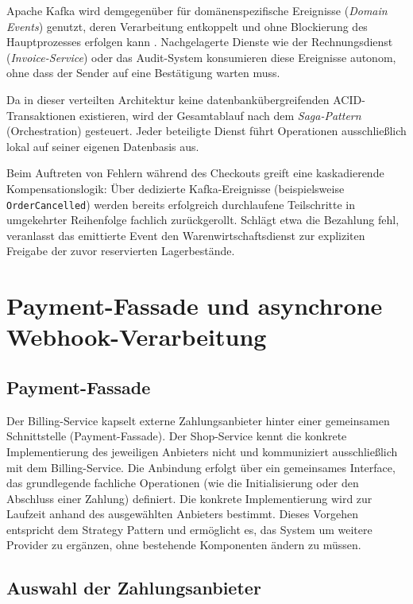\documentclass[
  11pt,
  a4paper,
  oneside,
  headings=normal,
  parskip=half,
  DIV=12
]{scrreprt}
\begin{document}
Apache Kafka wird demgegenüber für domänenspezifische Ereignisse (\textit{Domain Events}) genutzt, deren Verarbeitung entkoppelt und ohne Blockierung des Hauptprozesses erfolgen kann \cite{apacheKafka}. Nachgelagerte Dienste wie der Rechnungsdienst (\textit{Invoice-Service}) oder das Audit-System konsumieren diese Ereignisse autonom, ohne dass der Sender auf eine Bestätigung warten muss.

Da in dieser verteilten Architektur keine datenbankübergreifenden ACID-Transaktionen existieren, wird der Gesamtablauf nach dem \textit{Saga-Pattern} (Orchestration) gesteuert. Jeder beteiligte Dienst führt Operationen ausschließlich lokal auf seiner eigenen Datenbasis aus.

Beim Auftreten von Fehlern während des Checkouts greift eine kaskadierende Kompensationslogik: Über dedizierte Kafka-Ereignisse (beispielsweise \texttt{OrderCancelled}) werden bereits erfolgreich durchlaufene Teilschritte in umgekehrter Reihenfolge fachlich zurückgerollt. Schlägt etwa die Bezahlung fehl, veranlasst das emittierte Event den Warenwirtschaftsdienst zur expliziten Freigabe der zuvor reservierten Lagerbestände.

\section{Payment-Fassade und asynchrone Webhook-Verarbeitung}

\subsection{Payment-Fassade}

Der Billing-Service kapselt externe Zahlungsanbieter hinter einer gemeinsamen Schnittstelle (Payment-Fassade). Der Shop-Service kennt die konkrete Implementierung des jeweiligen Anbieters nicht und kommuniziert ausschließlich mit dem Billing-Service. Die Anbindung erfolgt über ein gemeinsames Interface, das grundlegende fachliche Operationen (wie die Initialisierung oder den Abschluss einer Zahlung) definiert. Die konkrete Implementierung wird zur Laufzeit anhand des ausgewählten Anbieters bestimmt. Dieses Vorgehen entspricht dem Strategy Pattern und ermöglicht es, das System um weitere Provider zu ergänzen, ohne bestehende Komponenten ändern zu müssen.

\subsection{Auswahl der Zahlungsanbieter}
\end{document}
